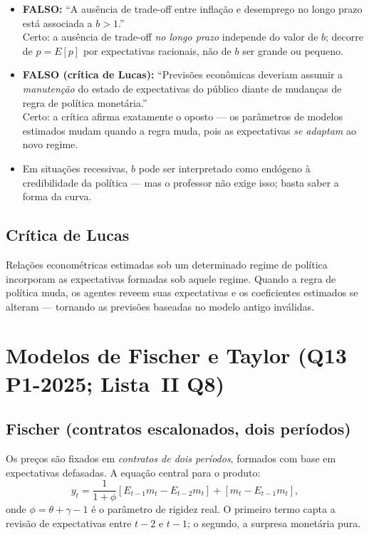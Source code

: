 \documentclass[12pt, a4paper]{article}
\begin{document}
\begin{armbox}[title={Armadilhas (Q11)}]
\begin{itemize}[leftmargin=*]
  \item \textbf{FALSO:} ``A ausência de trade-off entre inflação e desemprego no longo prazo está associada a $b > 1$.'' \\ Certo: a ausência de trade-off \emph{no longo prazo} independe do valor de $b$; decorre de $p = E[p]$ por expectativas racionais, não de $b$ ser grande ou pequeno.
  \item \textbf{FALSO (crítica de Lucas):} ``Previsões econômicas deveriam assumir a \emph{manutenção} do estado de expectativas do público diante de mudanças de regra de política monetária.'' \\ Certo: a crítica afirma exatamente o oposto — os parâmetros de modelos estimados mudam quando a regra muda, pois as expectativas \emph{se adaptam} ao novo regime.
  \item Em situações recessivas, $b$ pode ser interpretado como endógeno à credibilidade da política — mas o professor não exige isso; basta saber a forma da curva.
\end{itemize}
\end{armbox}

\subsection{Crítica de Lucas}

Relações econométricas estimadas sob um determinado regime de política incorporam as expectativas formadas sob aquele regime. Quando a regra de política muda, os agentes reveem suas expectativas e os coeficientes estimados se alteram — tornando as previsões baseadas no modelo antigo inválidas.

\section{Modelos de Fischer e Taylor (Q13 P1-2025; Lista~II Q8)}

\subsection{Fischer (contratos escalonados, dois períodos)}

Os preços são fixados em \emph{contratos de dois períodos}, formados com base em expectativas defasadas. A equação central para o produto:
\[
  y_t = \frac{1}{1+\phi}\!\left[E_{t-1}m_t - E_{t-2}m_t\right] + \left[m_t - E_{t-1}m_t\right],
\]
onde $\phi = \theta + \gamma - 1$ é o parâmetro de rigidez real. O primeiro termo capta a revisão de expectativas entre $t-2$ e $t-1$; o segundo, a surpresa monetária pura.
\end{document}
